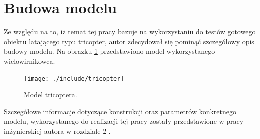 \section{Budowa modelu}
Ze względu na to, iż temat tej pracy bazuje na wykorzystaniu do testów gotowego obiektu latającego typu tricopter, autor zdecydował się pominąć szczegółowy opis budowy modelu. Na obrazku \ref{pic:tricopter} przedstawiono model wykorzystanego wielowirnikowca.

\begin{figure}[!htbp]
\centering
\texttt{[image: ./include/tricopter]}
\caption{Model tricoptera.}
\label{pic:tricopter}
\end{figure}

Szczegółowe informacje dotyczące konstrukcji oraz parametrów konkretnego modelu, wykorzystanego do realizacji tej pracy zostały przedstawione w pracy inżynierskiej autora w rozdziale 2 \cite{inz}.



